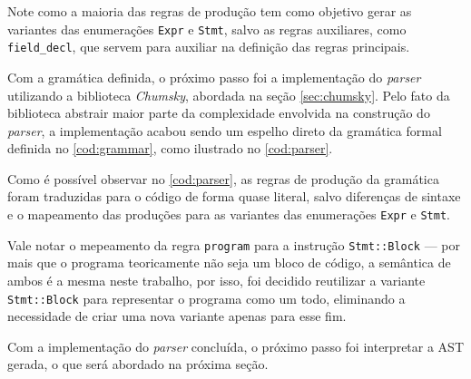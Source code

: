 \codigoRust

\vspace{-1em}

Note como a maioria das regras de produção tem como objetivo gerar as variantes das enumerações \texttt{Expr} e \texttt{Stmt}, salvo as regras auxiliares, como \texttt{field\_decl}, que servem para auxiliar na definição das regras principais.

Com a gramática definida, o próximo passo foi a implementação do \textit{parser} utilizando a biblioteca \textit{Chumsky}, abordada na seção \ref{sec:chumsky}. Pelo fato da biblioteca abstrair maior parte da complexidade envolvida na construção do \textit{parser}, a implementação acabou sendo um espelho direto da gramática formal definida no \autoref{cod:grammar}, como ilustrado no \autoref{cod:parser}.

\codigoRust

\vspace{-1em}

Como é possível observar no \autoref{cod:parser}, as regras de produção da gramática foram traduzidas para o código de forma quase literal, salvo diferenças de sintaxe e o mapeamento das produções para as variantes das enumerações \texttt{Expr} e \texttt{Stmt}.

Vale notar o mepeamento da regra \texttt{program} para a instrução \texttt{Stmt::Block} — por mais que o programa teoricamente não seja um bloco de código, a semântica de ambos é a mesma neste trabalho, por isso, foi decidido reutilizar a variante \texttt{Stmt::Block} para representar o programa como um todo, eliminando a necessidade de criar uma nova variante apenas para esse fim.

Com a implementação do \textit{parser} concluída, o próximo passo foi interpretar a AST gerada, o que será abordado na próxima seção.
